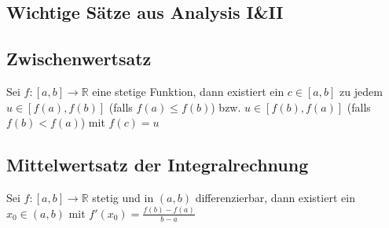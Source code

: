 \documentclass[8pt, a4paper, landscape, fleqn]{scrartcl}
\newenvironment {annotation}[1]
				{\begin{itshape} \begin{small} \textbf{#1} \begin{itemize}}
				{\end{itemize} \end{small} \end{itshape}}
\providecommand{\diff}{\mathop{} \! \mathrm{d}}
\begin{document}
\begin{multicols*}{3}

		\section{Wichtige Sätze aus Analysis I\&II}
			\subsection{Zwischenwertsatz}
				Sei $f: [a, b] \rightarrow \mathbb{R}$ eine stetige Funktion, dann existiert ein $c \in [a, b]$ zu jedem $u \in [f(a), f(b)]$ (falls $f(a) \le f(b)$) bzw. $u \in [f(b), f(a)]$ (falls $f(b) < f(a)$) mit $f(c)=u$
			\subsection{Mittelwertsatz der Integralrechnung}
				Sei $f: [a, b] \rightarrow \mathbb{R}$ stetig und in $(a, b)$ differenzierbar, dann existiert ein $x_0 \in (a, b)$ mit $f'(x_0)=\frac{f(b)-f(a)}{b-a}$

\end{multicols*}
\end{document}
